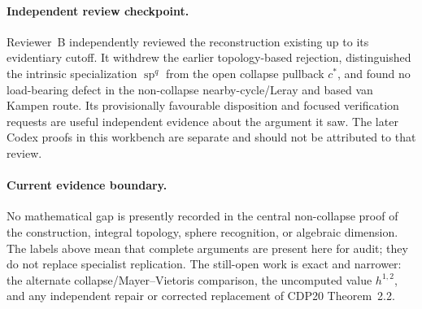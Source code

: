 \paragraph{Independent review checkpoint.}
Reviewer~B independently reviewed the reconstruction existing up to its
evidentiary cutoff.  It withdrew the earlier topology-based rejection,
distinguished the intrinsic specialization \(\operatorname{sp}^q\) from the
open collapse pullback \(c^*\), and found no load-bearing defect in the
non-collapse nearby-cycle/Leray and based van Kampen route.  Its
provisionally favourable disposition and focused verification requests are
useful independent evidence about the argument it saw.  The later Codex
proofs in this workbench are separate and should not be attributed to that
review.

\paragraph{Current evidence boundary.}
No mathematical gap is presently recorded in the central non-collapse proof
of the construction, integral topology, sphere recognition, or algebraic
dimension.  The labels above mean that complete arguments are present here
for audit; they do not replace specialist replication.  The still-open work
is exact and narrower: the alternate collapse/Mayer--Vietoris comparison,
the uncomputed value \(h^{1,2}\), and any independent repair or corrected
replacement of CDP20 Theorem~2.2.
